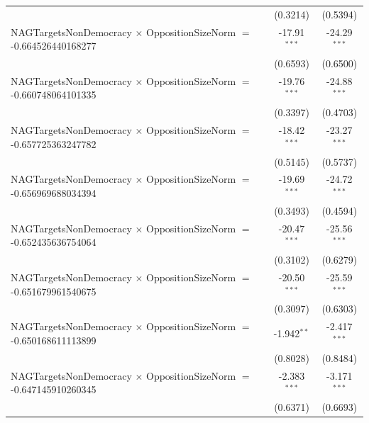\begin{tabular}{lcc}
                                                                                & (0.3214)             & (0.5394)\\   
   NAGTargetsNonDemocracy $\times$ OppositionSizeNorm $=$ -0.664526440168277    & -17.91$^{***}$       & -24.29$^{***}$\\   
                                                                                & (0.6593)             & (0.6500)\\   
   NAGTargetsNonDemocracy $\times$ OppositionSizeNorm $=$ -0.660748064101335    & -19.76$^{***}$       & -24.88$^{***}$\\   
                                                                                & (0.3397)             & (0.4703)\\   
   NAGTargetsNonDemocracy $\times$ OppositionSizeNorm $=$ -0.657725363247782    & -18.42$^{***}$       & -23.27$^{***}$\\   
                                                                                & (0.5145)             & (0.5737)\\   
   NAGTargetsNonDemocracy $\times$ OppositionSizeNorm $=$ -0.656969688034394    & -19.69$^{***}$       & -24.72$^{***}$\\   
                                                                                & (0.3493)             & (0.4594)\\   
   NAGTargetsNonDemocracy $\times$ OppositionSizeNorm $=$ -0.652435636754064    & -20.47$^{***}$       & -25.56$^{***}$\\   
                                                                                & (0.3102)             & (0.6279)\\   
   NAGTargetsNonDemocracy $\times$ OppositionSizeNorm $=$ -0.651679961540675    & -20.50$^{***}$       & -25.59$^{***}$\\   
                                                                                & (0.3097)             & (0.6303)\\   
   NAGTargetsNonDemocracy $\times$ OppositionSizeNorm $=$ -0.650168611113899    & -1.942$^{**}$        & -2.417$^{***}$\\   
                                                                                & (0.8028)             & (0.8484)\\   
   NAGTargetsNonDemocracy $\times$ OppositionSizeNorm $=$ -0.647145910260345    & -2.383$^{***}$       & -3.171$^{***}$\\   
                                                                                & (0.6371)             & (0.6693)\\   

\end{tabular}
